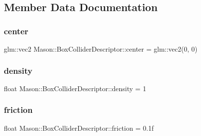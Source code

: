 \subsection{Member Data Documentation}
\hypertarget{class_mason_1_1_box_collider_descriptor_a76bdf93a5c562a89e1f513b2f4ee7a65}{}\label{class_mason_1_1_box_collider_descriptor_a76bdf93a5c562a89e1f513b2f4ee7a65} 
\subsubsection{\texorpdfstring{center}{center}}
{\footnotesize\ttfamily glm\+::vec2 Mason\+::\+Box\+Collider\+Descriptor\+::center = glm\+::vec2(0, 0)}

\hypertarget{class_mason_1_1_box_collider_descriptor_a084463ca0e2073f923ed8d58f62129a6}{}\label{class_mason_1_1_box_collider_descriptor_a084463ca0e2073f923ed8d58f62129a6} 
\subsubsection{\texorpdfstring{density}{density}}
{\footnotesize\ttfamily float Mason\+::\+Box\+Collider\+Descriptor\+::density = 1}

\hypertarget{class_mason_1_1_box_collider_descriptor_aa951d5f120f8f3d658d8265ed0b4e6e0}{}\label{class_mason_1_1_box_collider_descriptor_aa951d5f120f8f3d658d8265ed0b4e6e0} 
\subsubsection{\texorpdfstring{friction}{friction}}
{\footnotesize\ttfamily float Mason\+::\+Box\+Collider\+Descriptor\+::friction = 0.\+1f}

\hypertarget{class_mason_1_1_box_collider_descriptor_a7ed17142f44ec7337d38b34674b9e292}{}\label{class_mason_1_1_box_collider_descriptor_a7ed17142f44ec7337d38b34674b9e292} 
